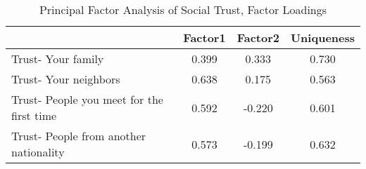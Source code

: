 \begin{table}[htbp]\centering
\def\sym#1{\ifmmode^{#1}\else\(^{#1}\)\fi}
\caption{Principal Factor Analysis of Social Trust, Factor Loadings}
\begin{tabular}{l*{1}{ccc}}
\hline\hline
                    &     Factor1&     Factor2&  Uniqueness\\
\hline
Trust- Your family  &       0.399&       0.333&       0.730\\
Trust- Your neighbors&       0.638&       0.175&       0.563\\
Trust- People you meet for the first time&       0.592&      -0.220&       0.601\\
Trust- People from another nationality&       0.573&      -0.199&       0.632\\
\hline\hline
\end{tabular}
\end{table}

